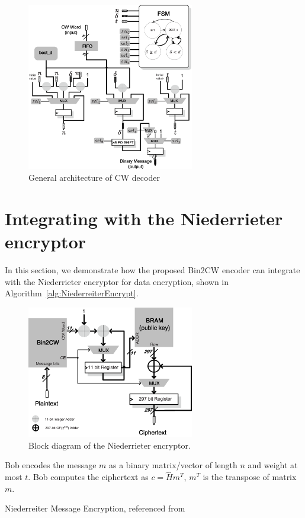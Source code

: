 \documentclass[10pt,journal,compsoc]{IEEEtran}
\begin{document}
\begin{figure}[!htb]\centering
      \includegraphics[width=0.65\textwidth]{./fig/decoder.eps}
  \caption{General architecture of CW decoder}\label{fig:decoder}
\end{figure}

\section{Integrating with the Niederrieter encryptor}
In this section, we demonstrate how the proposed Bin2CW encoder can integrate with the Niederrieter encryptor for data encryption, shown
in Algorithm~\ref{alg:NiederreiterEncrypt}.

\begin{figure}[!htb]\centering
   \includegraphics[width=0.65\textwidth]{./fig/encryptor.eps}
   \caption{Block diagram of the Niederrieter encryptor.}
    \label{fig:encryptor}
\end{figure}

\begin{algorithm}[!htb]	
	\DontPrintSemicolon %
	Bob encodes the message $m$ as a binary matrix/vector of length $n$ and weight at most $t$.\;
    Bob computes the ciphertext as $c = {\hat H}m^T$, $m^T$ is the transpose of matrix $m$.\;
	\caption{Niederreiter Message Encryption, referenced from \cite{hu2015application}}\label{alg:NiederreiterEncrypt}
\end{algorithm}
\end{document}
